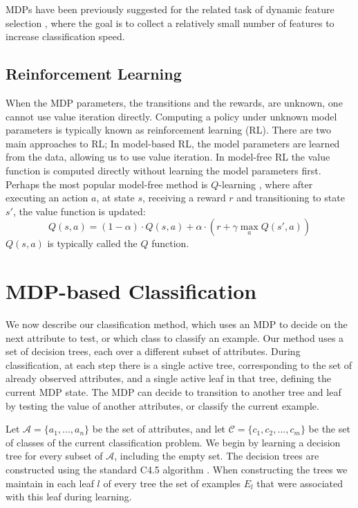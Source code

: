 \documentclass[letterpaper]{article}
\theoremstyle{definition}
\begin{document}
MDPs have been previously suggested for the related task of dynamic feature selection \cite{he2012cost}, where the goal is to collect a relatively small number of features to increase classification speed.

\subsection{Reinforcement Learning}

When the MDP parameters, the transitions and the rewards, are unknown, one cannot use value iteration directly. Computing a policy under unknown model parameters is typically known as reinforcement learning (RL)\cite{sutton1998reinforcement}. There are two main approaches to RL; In model-based RL, the model parameters are learned from the data, allowing us to use value iteration. In model-free RL the value function is computed directly without learning the model parameters first. Perhaps the most popular model-free method is $Q$-learning \cite{watkins1992q}, where after executing an action $a$, at state $s$, receiving a reward $r$ and transitioning to state $s'$, the value function is updated:
\begin{equation}
Q(s,a) = (1-\alpha) \cdot Q(s,a) + \alpha \cdot (r + \gamma \max_a Q(s',a))
\end{equation}
$Q(s,a)$ is typically called the $Q$ function. 


\section{MDP-based Classification}

We now describe our classification method, which uses an MDP to decide on the next attribute to test, or which class to classify an example. Our method uses a set of decision trees, each over a different subset of attributes. During classification, at each step there is a single active tree, corresponding to the set of already observed attributes, and a single active leaf in that tree, defining the current MDP state. The MDP can decide to transition to another tree and leaf by testing the value of another attributes, or classify the current example.

Let $\mathcal{A} = \{a_1,...,a_n\}$ be the set of attributes, and let $\mathcal{C} = \{c_1,c_2,...,c_m\}$ be the set of classes of the current classification problem. We begin by learning a decision tree for every subset of $\mathcal{A}$, including the empty set. The decision trees are constructed using the standard C4.5 algorithm \cite{quinlan2014c4}. When constructing the trees we maintain in each leaf $l$ of every tree the set of examples $E_l$ that were associated with this leaf during learning.
\end{document}
